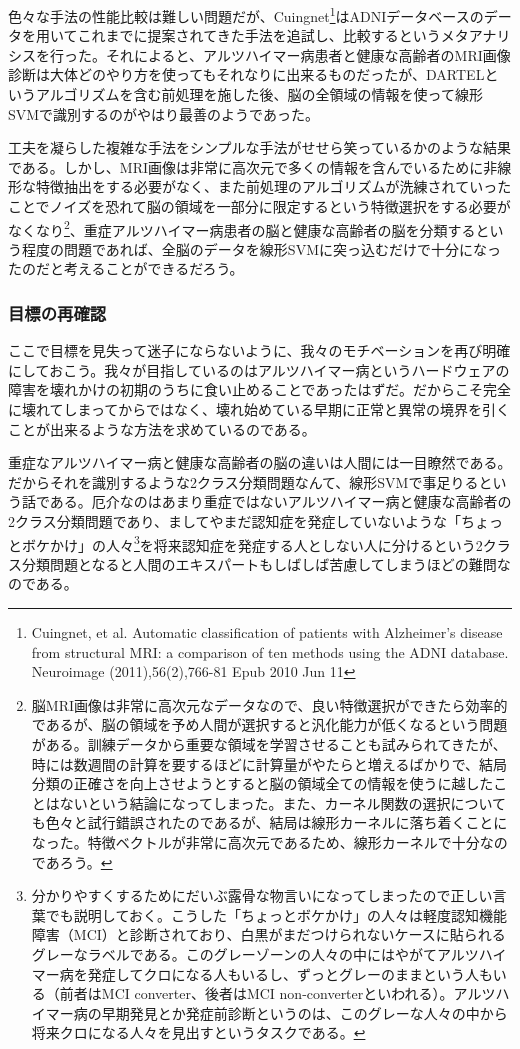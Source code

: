 色々な手法の性能比較は難しい問題だが、Cuingnet\footnote{Cuingnet, et al. Automatic classification of patients with Alzheimer's disease from structural MRI: a comparison of ten methods using the ADNI database. Neuroimage (2011),56(2),766-81 Epub 2010 Jun 11}はADNIデータベースのデータを用いてこれまでに提案されてきた手法を追試し、比較するというメタアナリシスを行った。それによると、アルツハイマー病患者と健康な高齢者のMRI画像診断は大体どのやり方を使ってもそれなりに出来るものだったが、DARTELというアルゴリズムを含む前処理を施した後、脳の全領域の情報を使って線形SVMで識別するのがやはり最善のようであった。

工夫を凝らした複雑な手法をシンプルな手法がせせら笑っているかのような結果である。しかし、MRI画像は非常に高次元で多くの情報を含んでいるために非線形な特徴抽出をする必要がなく、また前処理のアルゴリズムが洗練されていったことでノイズを恐れて脳の領域を一部分に限定するという特徴選択をする必要がなくなり\footnote{脳MRI画像は非常に高次元なデータなので、良い特徴選択ができたら効率的であるが、脳の領域を予め人間が選択すると汎化能力が低くなるという問題がある。訓練データから重要な領域を学習させることも試みられてきたが、時には数週間の計算を要するほどに計算量がやたらと増えるばかりで、結局分類の正確さを向上させようとすると脳の領域全ての情報を使うに越したことはないという結論になってしまった。また、カーネル関数の選択についても色々と試行錯誤されたのであるが、結局は線形カーネルに落ち着くことになった。特徴ベクトルが非常に高次元であるため、線形カーネルで十分なのであろう。}、重症アルツハイマー病患者の脳と健康な高齢者の脳を分類するという程度の問題であれば、全脳のデータを線形SVMに突っ込むだけで十分になったのだと考えることができるだろう。

\subsubsection{目標の再確認}
ここで目標を見失って迷子にならないように、我々のモチベーションを再び明確にしておこう。我々が目指しているのはアルツハイマー病というハードウェアの障害を壊れかけの初期のうちに食い止めることであったはずだ。だからこそ完全に壊れてしまってからではなく、壊れ始めている早期に正常と異常の境界を引くことが出来るような方法を求めているのである。

重症なアルツハイマー病と健康な高齢者の脳の違いは人間には一目瞭然である。だからそれを識別するような2クラス分類問題なんて、線形SVMで事足りるという話である。厄介なのはあまり重症ではないアルツハイマー病と健康な高齢者の2クラス分類問題であり、ましてやまだ認知症を発症していないような「ちょっとボケかけ」の人々\footnote{分かりやすくするためにだいぶ露骨な物言いになってしまったので正しい言葉でも説明しておく。こうした「ちょっとボケかけ」の人々は軽度認知機能障害（MCI）と診断されており、白黒がまだつけられないケースに貼られるグレーなラベルである。このグレーゾーンの人々の中にはやがてアルツハイマー病を発症してクロになる人もいるし、ずっとグレーのままという人もいる（前者はMCI converter、後者はMCI non-converterといわれる）。アルツハイマー病の早期発見とか発症前診断というのは、このグレーな人々の中から将来クロになる人々を見出すというタスクである。}を将来認知症を発症する人としない人に分けるという2クラス分類問題となると人間のエキスパートもしばしば苦慮してしまうほどの難問なのである。

